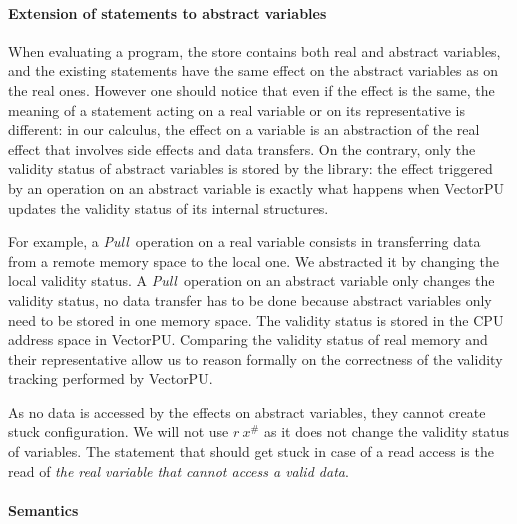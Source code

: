 \documentclass[preprint,12pt]{elsarticle}
\newcommand{\symb}[1]{\textit{#1}}
\newcommand{\Pull}{\symb{Pull}}
\newcommand{\abs}[1]{#1^\#}
\begin{document}
\paragraph{Extension of statements to abstract variables}
When evaluating a program, the store contains both real and abstract variables, and the 
existing 
statements have the same effect on the abstract variables as on the real ones. However 
one should notice that 
even if the effect is the same, the meaning of a statement acting on a real variable 
or on its representative is different: in our calculus, the effect on a variable is an 
abstraction of the real effect that involves side effects and data transfers. On the 
contrary, only the validity status of abstract variables is stored by the library: the 
effect triggered by an operation on an abstract variable is exactly what happens when 
VectorPU updates the validity status of its internal structures.

For example, a \Pull\ operation on a real variable consists in transferring data from a 
remote memory space 
to the local one. We abstracted it  by changing the local validity status. A \Pull\  
operation on an abstract variable only changes the validity status, no data transfer has 
to be done because abstract variables only need to be stored in one memory space. 
The validity status is stored in the CPU address space in VectorPU. Comparing the validity 
status of real memory and their representative  allow us to reason 
formally on the correctness of the validity tracking performed by VectorPU.

As no data is accessed by the effects on abstract variables, they cannot create stuck configuration. We will not use $r~\abs x$ as it does not 
change the validity 
status of variables. The statement that should get stuck in case of a read access is the 
read of \emph{the real variable that cannot access a valid data}. 


\paragraph{Semantics}
\end{document}
